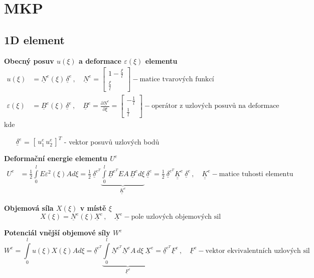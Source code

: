 \documentclass[10pt,oneside]{article}
\newcommand{\ul}[1]{\underline{#1}}
\newcommand{\ull}[1]{\underline{\underline{#1}}}
\begin{document}
\newpage
\section*{MKP}
%
\subsection*{1D element}
\textbf{Obecný posuv $u(\xi)$ a deformace $\varepsilon(\xi)$ elementu}
\begin{align*}
	u(\xi) &= \ul{N}^e\!(\xi)\, \ul{\delta}^e
	\,,\quad \ul{N}^e = \begin{bmatrix} 1-\frac{\xi}{l} \\ \frac{\xi}{l} \end{bmatrix} - \text{matice tvarových funkcí} \\
	\varepsilon(\xi) &= \ul{B}^e\!(\xi)\, \ul{\delta}^e
	\,,\quad \ul{B}^e = \frac{\partial \ul{N}^e}{\partial \xi} = \begin{bmatrix} -\frac{1}{l} \\ \frac{1}{l} \end{bmatrix} - \text{operátor z uzlových posuvů na deformace}
\end{align*}
kde
\begin{itemize}
	\item [$\ul{\delta}^e$] = $[\, u_1^e \, u_2^e \,]^T$ - vektor posuvů uzlových bodů
\end{itemize}

\textbf{Deformační energie elementu $U^e$}
\begin{align*}
	U^e &= \frac{1}{2} \int\limits_0^l E \varepsilon^2(\xi) A d\xi
		= \frac{1}{2}\ \ul{\delta}^{e^T} \underbrace{\int\limits_0^l \ul{B}^{e^T}\!E A\,\ul{B}^e d\xi}_{\ull{K}^e}\ \ul{\delta}^e
		= \frac{1}{2}\ \ul{\delta}^{e^T}\!\ull{K}^e\ \ul{\delta}^e
		\,,\quad
		\ull{K}^e - \text{matice tuhosti elementu}
\end{align*}

\textbf{Objemová síla $X(\xi)$ v místě $\xi$}
\begin{equation*}
	X(\xi) = \ul{N}^e\!(\xi) \ul{X}^e
	\,,\quad \ul{X}^e - \text{pole uzlových objemových sil}
\end{equation*}

\textbf{Potenciál vnější objemové síly $W^e$}
\begin{equation*}
	W^e = \int\limits_0^l u(\xi) X(\xi) A d\xi
		= \ul{\delta}^{e^T} \underbrace{\int\limits_0^l \ul{N}^{e^T} \ul{N}^e A\,d\xi\ \ul{X}^e}_{\ul{F}^e}
		= \ul{\delta}^{e^T} \ul{F}^e
		\,,\quad
		\ul{F}^e - \text{vektor ekvivalentních uzlových sil}
\end{equation*}
\end{document}
